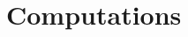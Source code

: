 \documentclass[journal]{IEEEtran}
\begin{document}



\section{Computations \label{sec:computations}}
\end{document}
